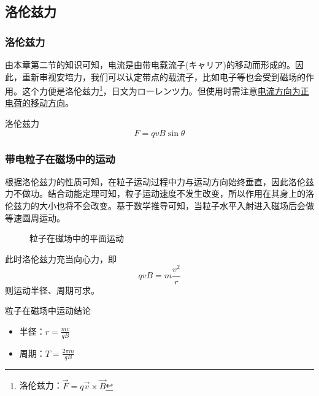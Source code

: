 \subsection{洛伦兹力}

\subsubsection{洛伦兹力}

由本章第二节的知识可知，电流是由带电载流子(キャリア)的移动而形成的。因此，重新审视安培力，我们可以认定带点的载流子，比如电子等也会受到磁场的作用。这个力便是洛伦兹力\footnote{洛伦兹力：$\vec{F}=q\vec{v}\times\vec{B}$}，日文为ローレンツ力。但使用时需注意\underline{电流方向为正电荷的移动方向}。
\begin{itembox}[l]{洛伦兹力}
    \begin{equation*}
        F=qvB\sin\theta
    \end{equation*}
\end{itembox}

\subsubsection{带电粒子在磁场中的运动}

根据洛伦兹力的性质可知，在粒子运动过程中力与运动方向始终垂直，因此洛伦兹力不做功。结合动能定理可知，粒子运动速度不发生改变，所以作用在其身上的洛伦兹力的大小也将不会改变。基于数学推导可知，当粒子水平入射进入磁场后会做等速圆周运动。
\begin{figure}[ht!]
    \centering
    \caption{粒子在磁场中的平面运动}
\end{figure}

此时洛伦兹力充当向心力，即
\begin{equation*}
    qvB=m\frac{v^2}{r}
\end{equation*}
则运动半径、周期可求。
\begin{itembox}[l]{粒子在磁场中运动结论}
    \begin{itemize}
        \item 半径：$r=\frac{mv}{qB}$
        \item 周期：$T=\frac{2\pi m}{qB}$
    \end{itemize}
\end{itembox}

